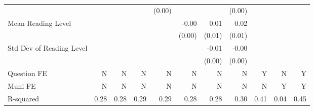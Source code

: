 \begin{tabular}{@{} l *{10}{d{2.5}} @{}}
                         &             &             &             & (0.00)      &             &             & (0.00)      &             &         &                     \\
Mean Reading Level       &             &             &             &             & -0.00       & 0.01        & 0.02        &             &         &                     \\
                         &             &             &             &             & (0.00)      & (0.01)      & (0.01)      &             &         &                     \\
Std Dev of Reading Level &             &             &             &             &             & -0.01       & -0.00       &             &         &                     \\
                         &             &             &             &             &             & (0.00)      & (0.00)      &             &         &                     \\
\midrule
Question FE              & N           & N           & N           & N           & N           & N           & N           & Y           & N       & Y                   \\
Muni FE                  & N           & N           & N           & N           & N           & N           & N           & N           & Y       & Y                   \\
R-squared                & 0.28        & 0.28        & 0.29        & 0.29        & 0.28        & 0.28        & 0.30        & 0.41        & 0.04    & 0.45                \\
\hline
\end{tabular}